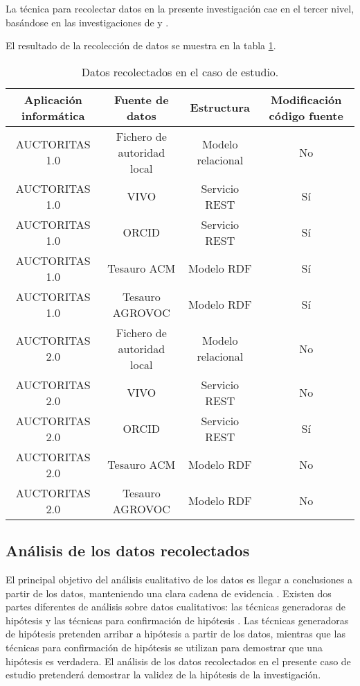 La técnica para recolectar datos en la presente investigación cae en el tercer nivel, basándose en las investigaciones de \cite{Calzadilla-Reyes2015} y \cite{Gonzalez-Barroso2016}.

El resultado de la recolección de datos se muestra en la tabla \ref{tabla: recoleccion}.

\begin{table}
\centering
\begin{tabular}{c|c|c|c}
\hline 
Aplicación informática & Fuente de datos & Estructura & Modificación código fuente \\ 
\hline 
AUCTORITAS 1.0 & Fichero de autoridad local & Modelo relacional & No\\
\hline
AUCTORITAS 1.0 & VIVO & Servicio REST & Sí\\
\hline
AUCTORITAS 1.0 & ORCID & Servicio REST & Sí\\
\hline
AUCTORITAS 1.0 & Tesauro ACM & Modelo RDF & Sí\\
\hline
AUCTORITAS 1.0 & Tesauro AGROVOC & Modelo RDF & Sí\\
\hline
AUCTORITAS 2.0 & Fichero de autoridad local & Modelo relacional & No\\
\hline
AUCTORITAS 2.0 & VIVO & Servicio REST & No\\
\hline
AUCTORITAS 2.0 & ORCID & Servicio REST & Sí\\
\hline
AUCTORITAS 2.0 & Tesauro ACM & Modelo RDF & No\\
\hline
AUCTORITAS 2.0 & Tesauro AGROVOC & Modelo RDF & No\\
\hline
\end{tabular} 
\caption{Datos recolectados en el caso de estudio.}
\label{tabla: recoleccion}
\end{table}

\subsection{Análisis de los datos recolectados}
El principal objetivo del análisis cualitativo de los datos es llegar a conclusiones a partir de los datos, manteniendo una clara cadena de evidencia \citep{Wohlin2012}. Existen dos partes diferentes de análisis sobre datos cualitativos: las técnicas generadoras de hipótesis y las técnicas para confirmación de hipótesis \citep{799955}. Las técnicas generadoras de hipótesis pretenden arribar a hipótesis a partir de los datos, mientras que las técnicas para confirmación de hipótesis se utilizan para demostrar que una hipótesis es verdadera. El análisis de los datos recolectados en el presente caso de estudio pretenderá demostrar la validez de la hipótesis de la investigación.

